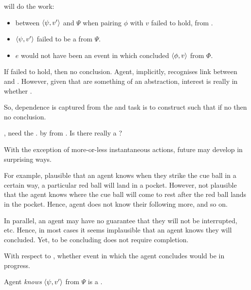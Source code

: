 \begin{note}
   will do the work:

  \begin{itemize}
  \item
     between \(\langle \psi, v' \rangle\) and \(\Psi\) when pairing \(\phi\) with \(v\) failed to hold, from .
  \item
    \(\langle \psi, v' \rangle\) failed to be a \fc{} from \(\Psi\).
  \item
    \(e\) would not have been an event in which \vAgent{} concluded \(\langle \phi, v \rangle\) from \(\Phi\).
  \end{itemize}

  If \fc{} failed to hold, then no conclusion.
  Agent, implicitly, recognises link between  and .
  However, given that  are something of an abstraction, interest is really in whether \fc{}.

  So, dependence is captured from the \agpe{} and task is to construct  such that if no  then no conclusion.
\end{note}

\begin{note}
  \qWhyV{}, need the \ros{}.
  \ros{} by \fc{} from \agpe{}.
  Is there really a \ros{}?
\end{note}

\begin{note}
  With the exception of more-or-less instantaneous actions, future may develop in surprising ways.

  For example, plausible that an agent knows when they strike the cue ball in a certain way, a particular red ball will land in a pocket.
  However, not plausible that the agent knows where the cue ball will come to rest after the red ball lands in the pocket.
  Hence, agent does not know their following more, and so on.

  In parallel, an agent may have no guarantee that they will not be interrupted, etc.
  Hence, in most cases it seems implausible that an agent knows they will concluded.
  Yet, to be concluding does not require completion.

  With respect to \fc{}, whether event in which the agent concludes would be in progress.
\end{note}

\begin{note}
  Agent \emph{knows} \(\langle \psi, v' \rangle\) from \(\Psi\) is a \fc{}.
\end{note}

